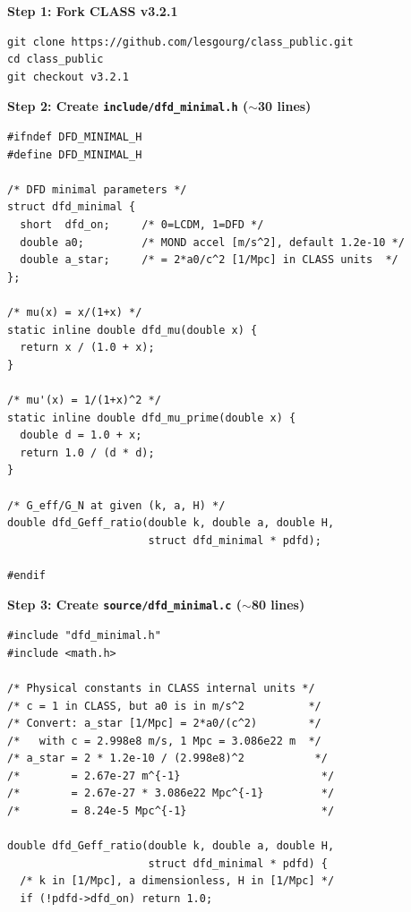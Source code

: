 \documentclass[11pt]{article}
\theoremstyle{definition}
\theoremstyle{remark}
\begin{document}
\begin{tcolorbox}[colback=green!5!white, colframe=green!60!black,
  title=\textbf{MINIMAL mochi\_class: Complete Coding Specification}]

\textbf{Step 1: Fork CLASS v3.2.1}

\begin{verbatim}
git clone https://github.com/lesgourg/class_public.git
cd class_public
git checkout v3.2.1
\end{verbatim}

\textbf{Step 2: Create \texttt{include/dfd\_minimal.h} ($\sim$30 lines)}

\begin{lstlisting}[caption={dfd\_minimal.h --- complete header}]
#ifndef DFD_MINIMAL_H
#define DFD_MINIMAL_H

/* DFD minimal parameters */
struct dfd_minimal {
  short  dfd_on;     /* 0=LCDM, 1=DFD */
  double a0;         /* MOND accel [m/s^2], default 1.2e-10 */
  double a_star;     /* = 2*a0/c^2 [1/Mpc] in CLASS units  */
};

/* mu(x) = x/(1+x) */
static inline double dfd_mu(double x) {
  return x / (1.0 + x);
}

/* mu'(x) = 1/(1+x)^2 */
static inline double dfd_mu_prime(double x) {
  double d = 1.0 + x;
  return 1.0 / (d * d);
}

/* G_eff/G_N at given (k, a, H) */
double dfd_Geff_ratio(double k, double a, double H,
                      struct dfd_minimal * pdfd);

#endif
\end{lstlisting}

\textbf{Step 3: Create \texttt{source/dfd\_minimal.c} ($\sim$80 lines)}

\begin{lstlisting}[caption={dfd\_minimal.c --- complete implementation}]
#include "dfd_minimal.h"
#include <math.h>

/* Physical constants in CLASS internal units */
/* c = 1 in CLASS, but a0 is in m/s^2          */
/* Convert: a_star [1/Mpc] = 2*a0/(c^2)        */
/*   with c = 2.998e8 m/s, 1 Mpc = 3.086e22 m  */
/* a_star = 2 * 1.2e-10 / (2.998e8)^2           */
/*        = 2.67e-27 m^{-1}                      */
/*        = 2.67e-27 * 3.086e22 Mpc^{-1}         */
/*        = 8.24e-5 Mpc^{-1}                     */

double dfd_Geff_ratio(double k, double a, double H,
                      struct dfd_minimal * pdfd) {
  /* k in [1/Mpc], a dimensionless, H in [1/Mpc] */
  if (!pdfd->dfd_on) return 1.0;


\end{lstlisting}
\end{tcolorbox}
\end{document}
